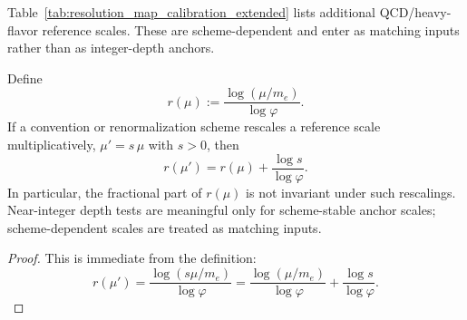 Table~\ref{tab:resolution_map_calibration_extended} lists additional QCD/\allowbreak heavy-flavor reference scales. These are scheme-dependent and enter as matching inputs rather than as integer-depth anchors.

\begin{proposition}\label{prop:resolution_scheme_shift}
Define
\[
r(\mu):=\frac{\log(\mu/m_e)}{\log\varphi}.
\]
If a convention or renormalization scheme rescales a reference scale multiplicatively, $\mu' = s\,\mu$ with $s>0$, then
\begin{equation}
r(\mu')=r(\mu)+\frac{\log s}{\log\varphi}.
\end{equation}
In particular, the fractional part of $r(\mu)$ is not invariant under such rescalings. Near-integer depth tests are meaningful only for scheme-stable anchor scales; scheme-dependent scales are treated as matching inputs.
\end{proposition}
\begin{proof}
This is immediate from the definition:
\[
r(\mu')=\frac{\log(s\mu/m_e)}{\log\varphi}=\frac{\log(\mu/m_e)}{\log\varphi}+\frac{\log s}{\log\varphi}.
\]
\end{proof}

